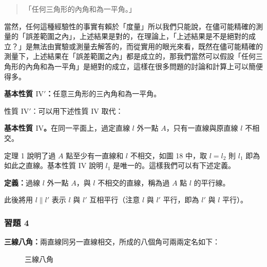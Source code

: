 \begin{quote}
  「任何三角形的內角和為一平角。」
\end{quote}
當然，任何這種經驗性的事實有賴於「度量」所以我們只能說，在儘可能精確的測量的「誤差範圍之內」，上述結果是對的，在理論上，「上述結果是不是絕對的成立？」是無法由實驗或測量去解答的，而從實用的眼光來看，既然在儘可能精確的測量下，上述結果在「誤差範圍之內」都是成立的，那我們當然可以假設「任何三角形的內角和為一平角」是絕對的成立，這樣在很多問題的討論和計算上可以簡便得多。

\noindent\textbf{基本性質 $\mathrm{IV}'$：}任意三角形的三內角和為一平角。

\noindent 性質 $\mathrm{IV}'$：可以用下述性質 $\mathrm{IV}$ 取代：

\noindent\textbf{基本性質 $\mathrm{IV}$。}在同一平面上，過定直線 $l$ 外一點 $A$，只有一直線與原直線 $l$ 不相交。

定理 1 說明了過 $A$ 點至少有一直線和 $l$ 不相交，如圖 18 中，取 $l = l_2$ 則 $l_1$ 即為如此之直線。基本性質 $\mathrm{IV}$ 說明 $l_1$ 是唯一的。這樣我們可以有下述定義。

\noindent\textbf{定義：}過線 $l$ 外一點 $A$，與 $l$ 不相交的直線，稱為過 $A$ 點 $l$ 的平行線。

此後將用 $l \parallel l'$ 表示 $l$ 與 $l'$ 互相平行（注意 $l$ 與 $l'$ 平行，即為 $l'$ 與 $l$ 平行）。

\subsubsection*{習題 4}

\noindent\textbf{三線八角：}兩直線同另一直線相交，所成的八個角可兩兩定名如下：

\begin{figure}[H]
\centering
{}
\caption{三線八角}
\label{fig:b3-a1-21}
\end{figure}

